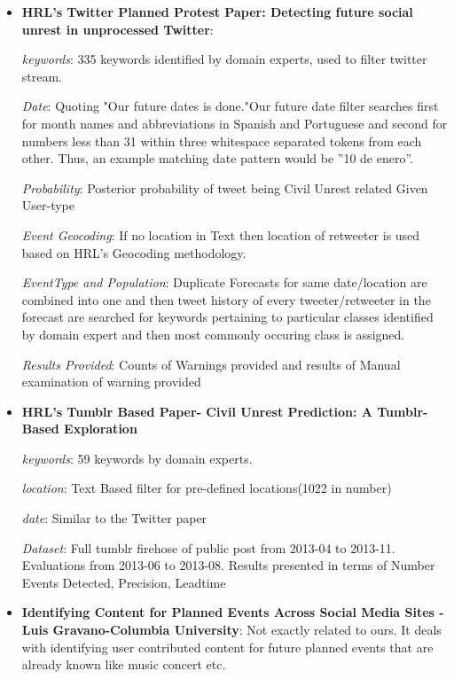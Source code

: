 \begin{itemize}
    \item
        \textbf{HRL's Twitter Planned Protest Paper: Detecting future social unrest in unprocessed Twitter}: 

        {\em keywords}: 335 keywords identified by domain experts, used to filter twitter stream.

        {\em Date}: Quoting "Our future dates is done."Our future date filter searches first for month names and abbreviations in Spanish and Portuguese and second for numbers less than 31 within three whitespace separated tokens from each other. Thus, an example matching date pattern would be ”10 de enero”.


        {\em Probability}: Posterior probability of tweet being Civil Unrest related Given User-type

        {\em Event Geocoding}: If no location in Text then location of retweeter is used based on HRL's Geocoding methodology.

        {\em EventType and Population}: Duplicate Forecasts for same date/location are combined into one and then tweet history of every tweeter/retweeter in the forecast are searched for keywords pertaining to particular classes identified by domain expert and then most commonly occuring class is assigned.
        
        {\em Results Provided}: Counts of Warnings provided and results of Manual examination of warning provided

    \item \textbf{HRL's Tumblr Based Paper- Civil Unrest Prediction: A Tumblr-Based Exploration}

        {\em keywords}: 59 keywords by domain experts.

        {\em location}: Text Based filter for pre-defined locations(1022 in number)

        {\em date}: Similar to the Twitter paper

        {\em Dataset}: Full tumblr firehose of public post from 2013-04 to 2013-11. Evaluations from 2013-06 to 2013-08. Results presented in terms of Number Events Detected, Precision, Leadtime

    \item \textbf{Identifying Content for Planned Events Across Social Media Sites - Luis Gravano-Columbia University}:
            Not exactly related to ours. It deals with identifying user contributed content for future planned events that are already known like music concert etc.

\end{itemize}
